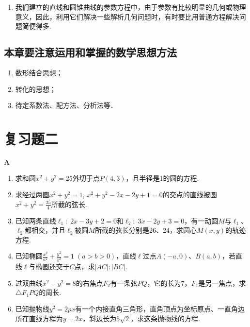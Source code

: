 \begin{enumerate}
\begin{enumerate}[(1)]
    \item 双曲线：
    中心在$O'(x_0,y_0)$，实半轴为$a$，虚半轴为$b$，焦点在
与$x$轴平行的直线上的双曲线参数方程为
\[\begin{cases}
    x=x_0+a\sec\varphi\\
    y=y_0+b\tan\varphi\\
\end{cases}\]
其中$\varphi$为参数，它叫双曲线的离心角，$\varphi$的范围是
\[\left[0,\; \frac{\pi}{2}\right)\cup\left(\frac{\pi}{2},\; \frac{3\pi}{2}\right)\cup \left(\frac{3\pi}{2},\; 2\pi\right)\]
\item 抛物线：
顶点在$O(0,0)$，焦参数为$p$，开口方向向右的抛物线参数方程为
\[\begin{cases}
    x=2pt^2\\ y=2pt
\end{cases}\]
其中$t$是参数，$t$表示连结$O(0,0)$和抛物线上动点$P(x,y)$的直线斜率的倒数.
\end{enumerate}
\item 我们建立的直线和圆锥曲线的参数方程中，由于参数有比较明显的几何或物理意义，因此，利用它们解决一些解析几何问题时，有时要比用普通方程解决问题简便得多.
\end{enumerate}


\subsection{本章要注意运用和掌握的数学思想方法}
\begin{enumerate}
\item 数形结合思想；
\item 转化的思想；
\item 待定系数法、配方法、分析法等．
\end{enumerate}


\section*{复习题二}
\begin{center}
    \bfseries A
\end{center}

\begin{enumerate}
    \item 求和圆$x^2+y^2=25$外切于点$P(4,3)$，且半径是1的圆的方程.
    \item 求经过两圆$x^2+y^2=1$, $x^2+y^2-2x-2y+1=0$的交点的直线被圆$x^2+y^2=\frac{25}{4}$所截的弦长.
    \item 已知两条直线$\ell_1:\; 2x-3y+2=0$和$\ell_2:\; 3x-2y+3=0$，有一动圆$M$与$\ell_1$、$\ell_2$都相交，并且$\ell_2$被圆$M$所截的弦长分别是26、24，求圆心$M(x,y)$的轨迹方程.
    \item 已知椭圆$\frac{x^2}{a^2}+\frac{y^2}{b^2}=1\; (a>b>0)$，直线$\ell$过点$A(-a,0)$、$B(a,b)$，若直线$\ell$与椭圆还交于$C$点，求$|AC|:|BC|$.
    \item 过双曲线$x^2-y^2=8$的右焦点$F_2$有一条弦$PQ$，它的长为7，$F_1$是另一焦点，求$\triangle F_1PQ$的周长.
    \item 已知抛物线$y^2=2px$有一个内接直角三角形，直角顶点为坐标原点、一直角边所在直线方程为$y=2x$，斜边长为$5\sqrt{2}$，求这条抛物线的方程.
\end{enumerate}

